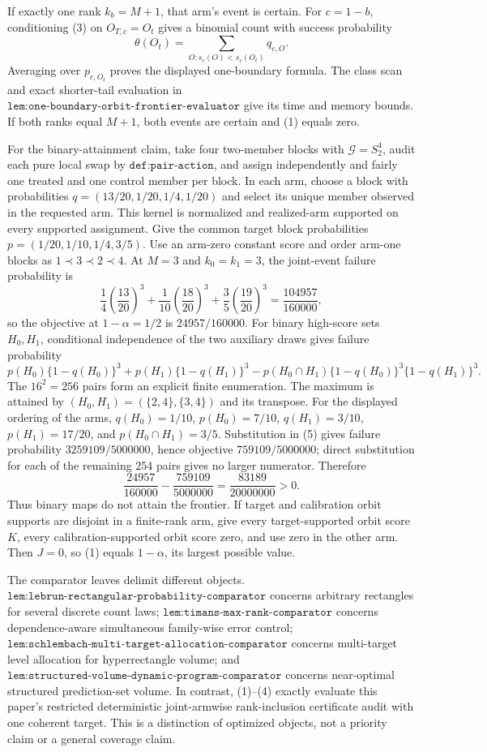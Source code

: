 If exactly one rank \(k_b=M+1\), that arm's event is certain. For \(c=1-b\), conditioning (3) on \(O_{T,c}=O_t\) gives a binomial count with success probability
\[
\theta(O_t)=\sum_{O:s_c(O)<s_c(O_t)}q_{c,O}.
\]
Averaging over \(p_{c,O_t}\) proves the displayed one-boundary formula. The class scan and exact shorter-tail evaluation in \(\texttt{lem:one-boundary-orbit-frontier-evaluator}\) give its time and memory bounds. If both ranks equal \(M+1\), both events are certain and (1) equals zero.

For the binary-attainment claim, take four two-member blocks with \(\mathcal G=S_2^4\), audit each pure local swap by \(\texttt{def:pair-action}\), and assign independently and fairly one treated and one control member per block. In each arm, choose a block with probabilities \(q=(13/20,1/20,1/4,1/20)\) and select its unique member observed in the requested arm. This kernel is normalized and realized-arm supported on every supported assignment. Give the common target block probabilities \(p=(1/20,1/10,1/4,3/5)\). Use an arm-zero constant score and order arm-one blocks as \(1\prec3\prec2\prec4\). At \(M=3\) and \(k_0=k_1=3\), the joint-event failure probability is
\[
\frac14\left(\frac{13}{20}\right)^3+\frac1{10}\left(\frac{18}{20}\right)^3+\frac35\left(\frac{19}{20}\right)^3=\frac{104957}{160000},
\]
so the objective at \(1-\alpha=1/2\) is \(24957/160000\). For binary high-score sets \(H_0,H_1\), conditional independence of the two auxiliary draws gives failure probability
\[
p(H_0)\{1-q(H_0)\}^3+p(H_1)\{1-q(H_1)\}^3-p(H_0\cap H_1)\{1-q(H_0)\}^3\{1-q(H_1)\}^3.
\tag{5}
\]
The \(16^2=256\) pairs form an explicit finite enumeration. The maximum is attained by \((H_0,H_1)=(\{2,4\},\{3,4\})\) and its transpose. For the displayed ordering of the arms, \(q(H_0)=1/10\), \(p(H_0)=7/10\), \(q(H_1)=3/10\), \(p(H_1)=17/20\), and \(p(H_0\cap H_1)=3/5\). Substitution in (5) gives failure probability \(3259109/5000000\), hence objective \(759109/5000000\); direct substitution for each of the remaining \(254\) pairs gives no larger numerator. Therefore
\[
\frac{24957}{160000}-\frac{759109}{5000000}=\frac{83189}{20000000}>0.
\]
Thus binary maps do not attain the frontier. If target and calibration orbit supports are disjoint in a finite-rank arm, give every target-supported orbit score \(K\), every calibration-supported orbit score zero, and use zero in the other arm. Then \(J=0\), so (1) equals \(1-\alpha\), its largest possible value.

The comparator leaves delimit different objects. \(\texttt{lem:lebrun-rectangular-probability-comparator}\) concerns arbitrary rectangles for several discrete count laws; \(\texttt{lem:timans-max-rank-comparator}\) concerns dependence-aware simultaneous family-wise error control; \(\texttt{lem:schlembach-multi-target-allocation-comparator}\) concerns multi-target level allocation for hyperrectangle volume; and \(\texttt{lem:structured-volume-dynamic-program-comparator}\) concerns near-optimal structured prediction-set volume. In contrast, (1)--(4) exactly evaluate this paper's restricted deterministic joint-armwise rank-inclusion certificate audit with one coherent target. This is a distinction of optimized objects, not a priority claim or a general coverage claim.

